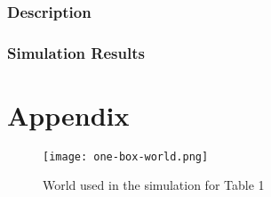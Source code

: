 \documentclass[a4paper]{article}
\begin{document}
\section{Description}
\newpage
\section{Simulation Results}





\newpage
\part{Appendix}
\begin{figure}[H]
\centering
\texttt{[image: one-box-world.png]}
\caption{World used in the simulation for Table 1}
\end{figure}





\nocite{*}
\end{document}
